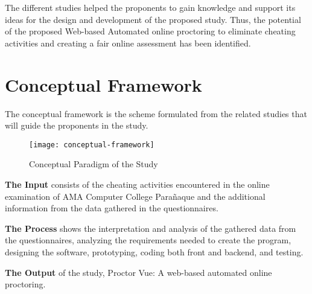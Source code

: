 The different studies helped the proponents to gain knowledge and support its ideas for the design and development of the proposed study.
Thus, the potential of the proposed Web-based Automated online proctoring to eliminate cheating activities and creating a fair online assessment has been identified.

\section{Conceptual Framework}

The conceptual framework is the scheme formulated from the related studies that will guide the proponents in the study.

\begin{figure}[h!]
   \begin{center}
      \texttt{[image: conceptual-framework]}
      \caption{Conceptual Paradigm of the Study}
   \end{center}
\end{figure}

\textbf{The Input} consists of the cheating activities encountered in the online examination of AMA Computer College Parañaque and the additional information from the data gathered in the questionnaires.

\textbf{The Process} shows the interpretation and analysis of the gathered data from the questionnaires, analyzing the requirements needed to create the program, designing the software, prototyping, coding both front and backend, and testing.

\textbf{The Output} of the study, Proctor Vue: A web-based automated online proctoring.

